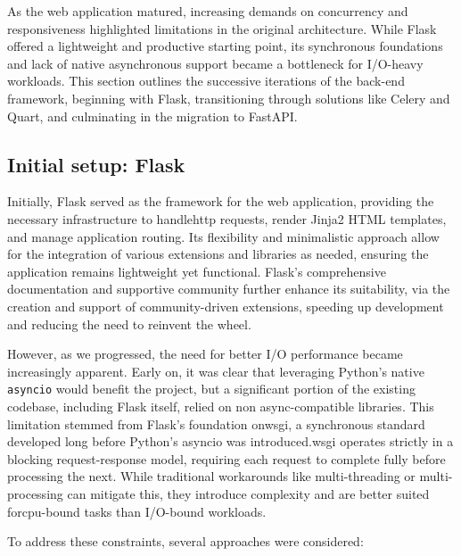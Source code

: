     As the web application matured, increasing demands on concurrency and responsiveness highlighted limitations in the original architecture. 
    While Flask offered a lightweight and productive starting point, its synchronous foundations and lack of native asynchronous support became 
    a bottleneck for I/O-heavy workloads. This section outlines the successive iterations of the back-end framework, beginning with Flask, 
    transitioning through solutions like Celery and Quart, and culminating in the migration to FastAPI. 

    \subsection{Initial setup: Flask}

        Initially, Flask served as the framework for the web application, providing the necessary infrastructure to handle\ac{http} 
        requests, render Jinja2 HTML templates, and manage application routing. Its flexibility and minimalistic approach allow for the 
        integration of various extensions and libraries as needed, ensuring the application remains lightweight yet functional. 
        Flask's comprehensive documentation and supportive community further enhance its suitability, via the creation and support
        of community-driven extensions, speeding up development and reducing the need to reinvent the wheel.

        However, as we progressed, the need for better I/O performance became increasingly apparent. Early on, it was 
        clear that leveraging Python's native \texttt{asyncio} would benefit the project, but a significant portion of the existing codebase, 
        including Flask itself, relied on non async-compatible libraries. This limitation stemmed from Flask's foundation on\ac{wsgi}, a 
        synchronous standard developed long before Python's asyncio was introduced.\ac{wsgi} operates strictly in a blocking request-response 
        model, requiring each request to complete fully before processing the next. While traditional workarounds like multi-threading 
        or multi-processing can mitigate this, they introduce complexity and are better suited for\ac{cpu}-bound tasks than I/O-bound workloads.

        To address these constraints, several approaches were considered:

